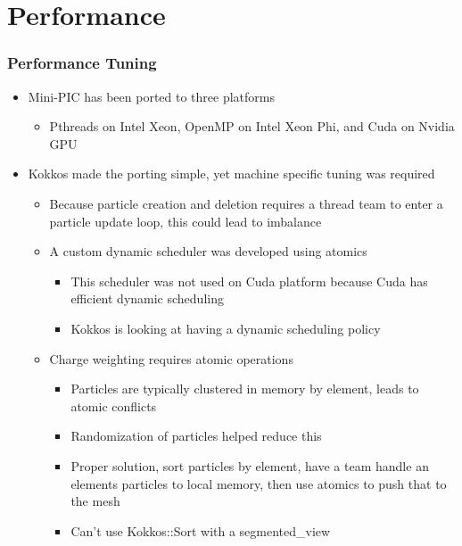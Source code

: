 \documentclass[t]{beamer}
\begin{document}
\section{Performance}


\begin{frame}
 
 \frametitle{Performance Tuning}

 \begin{itemize}
   \item {Mini-PIC has been ported to three platforms}
   \begin{itemize}
     \item {Pthreads on Intel Xeon, OpenMP on Intel Xeon Phi, and Cuda
     on Nvidia GPU}
   \end{itemize}
   \item {Kokkos made the porting simple, yet machine specific
       tuning was required}
  \begin{itemize}
     \item {Because particle creation and deletion requires a thread team to
       enter a particle update loop, this could lead to imbalance }
     \item {A custom dynamic scheduler was developed using atomics}
   \begin{itemize}
     \item {This scheduler was not used on Cuda platform because Cuda
       has efficient dynamic scheduling}
     \item {Kokkos is looking at having a dynamic scheduling policy}
   \end{itemize}
   \item {Charge weighting requires atomic operations}
   \begin{itemize}
     \item {Particles are typically clustered in memory by element,
       leads to atomic conflicts}
     \item {Randomization of particles helped reduce this }
     \item {Proper solution, sort particles by element, have a team
       handle an elements particles to local memory, then use atomics
       to push that to the mesh}
       \item {Can't use Kokkos::Sort with a segmented\_view}
   \end{itemize}

 
   \end{itemize}
  \end{itemize}
\end{frame}
\end{document}
